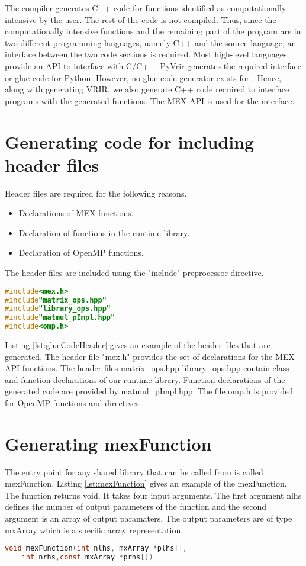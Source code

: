 The \velocty compiler generates C++ code for functions identified as computationally intensive by the user. The rest of the code is not compiled. Thus, since the computationally intensive functions and the remaining part of the program are in two different programming languages, namely C++ and the source language, an interface between the two code sections is required. Most high-level languages provide an API to interface with C/C++. PyVrir generates the required interface or glue code for Python. However, no glue code generator exists for \matlab.  Hence, along with generating VRIR, we also generate C++ code required to interface \matlab programs with the generated functions. The \matlab MEX API is used for the interface. 
\section{Generating code for including header files}
Header files are required for the following reasons.
\begin{itemize}
\item Declarations of MEX functions. 
\item Declaration of functions in the runtime library. 
\item Declaration of OpenMP functions.
\end{itemize}
The header files are included using the "include" preprocessor directive. 
\begin{lstlisting}[float,language=c,caption={Example of header files in glue code},label={lst:glueCodeHeader}]
#include<mex.h>
#include"matrix_ops.hpp"
#include"library_ops.hpp"
#include"matmul_pImpl.hpp"
#include<omp.h>
\end{lstlisting}
Listing \ref{lst:glueCodeHeader} gives an example of the header files that are generated. The header file "mex.h" provides the set of declarations for the MEX API functions. The header files matrix\_ops.hpp library\_ops.hpp contain class and function declarations of our runtime library. Function declarations of the generated code are provided by matmul\_pImpl.hpp. The file omp.h is provided for OpenMP functions and directives. 
\section{Generating mexFunction}
The entry point for any shared library that can be called from \matlab is called mexFunction. Listing \ref{lst:mexFunction} gives an example of the mexFunction. The function returns void. It takes four input arguments. The first argument nlhs defines the number of output parameters of the function and the second argument is an array of output paramaters. The output parameters are of type mxArray which is a \matlab specific array representation. 
\begin{lstlisting}[language=c,caption={The entry point function for the MEX API},label={lst:mexFunction}]
void mexFunction(int nlhs, mxArray *plhs[],
    int nrhs,const mxArray *prhs[])
\end{lstlisting}
